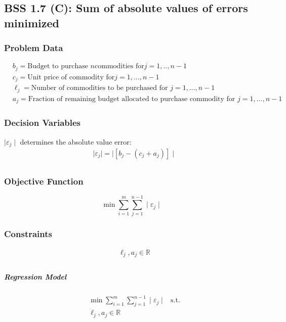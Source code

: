 \documentclass[12pt]{article}
\begin{document}
\subsection{BSS 1.7 (C): Sum of absolute values of errors minimized}
\subsubsection{Problem Data}
\begin{equation*}
    \begin{split}
        &b_j= \text{Budget to purchase }n \text{commodities for} j=1,..,n-1\\
        &c_j=\text{Unit price of commodity for} j=1,...,n-1\\
        &\ell_j= \text{Number of commodities to be purchased for } j=1,...,n-1\\
        &a_j= \text{Fraction of remaining budget allocated to purchase commodity for } j=1,...,n-1
    \end{split}
\end{equation*}
\subsubsection{Decision Variables}
\( \mid \varepsilon_j  \mid \) determines the absolute value error:
    \begin{align*}    
        &\mid \varepsilon_j \mid= \mid [b_j-(c_j + a_j)]\mid\\
    \end{align*}

\subsubsection{Objective Function}
\begin{equation*}
    \min \sum_{i=1}^{m}\sum_{j=1}^{n-1} \mid \varepsilon_j \mid
\end{equation*}

\subsubsection{Constraints}
    \begin{align*}
        &\ell_j, a_j \in \mathbb{R}\\
    \end{align*}
\subparagraph{Regression Model}
    \begin{align*}
        &\min \sum_{i=1}^{m}\sum_{j=1}^{n-1} \mid \varepsilon_j \mid
        &\text{s.t.}\\
        &\ell_j, a_j \in \mathbb{R} \\
    \end{align*}
\end{document}
